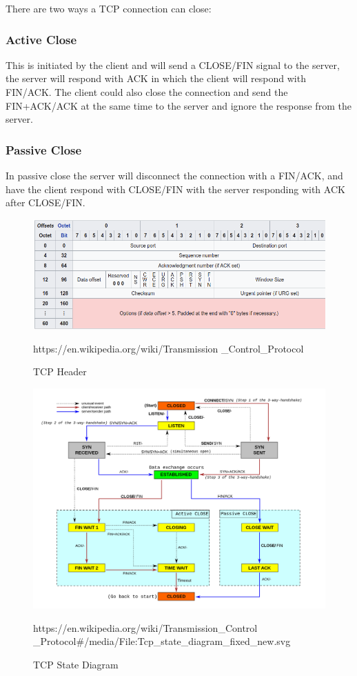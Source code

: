 \documentclass[../CMPUT-404-Notes.tex]{subfiles}
\begin{document}
There are two ways a TCP connection can close:
\subsubsection{Active Close}
This is initiated by the client and will send a CLOSE/FIN signal to the server, the server will respond with ACK in which the client will respond with FIN/ACK.
The client could also close the connection and send the FIN+ACK/ACK at the same time to the server and ignore the response from the server.

\subsubsection{Passive Close}
In passive close the server will disconnect the connection with a FIN/ACK, and have the client respond with CLOSE/FIN with the server responding with ACK after CLOSE/FIN.

\begin{figure}[!h]
  \centering
  \includegraphics[width=\columnwidth]{../assets/TCP-header.png}
  \caption{TCP Header}
  https://en.wikipedia.org/wiki/Transmission \_Control\_Protocol
\end{figure}

\begin{figure}[!h]
  \centering
  \includegraphics[width=\columnwidth]{../assets/Tcp-state-diagram-fixed-new.png}
  \caption{TCP State Diagram}
  https://en.wikipedia.org/wiki/Transmission\_Control \_Protocol\#/media/File:Tcp\_state\_diagram\_fixed\_new.svg
\end{figure}
\end{document}
